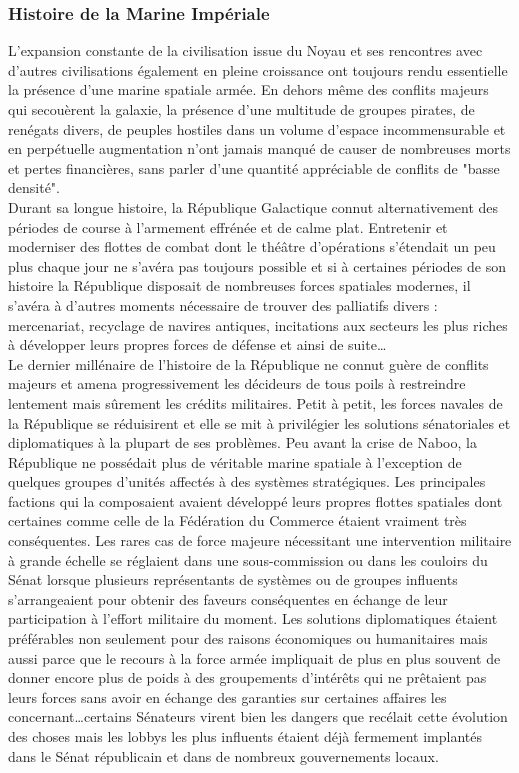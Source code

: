 \documentclass[twoside]{article}
\begin{document}
\subsubsection{Histoire de la Marine Impériale}
L'expansion constante de la civilisation issue du Noyau et ses rencontres avec d'autres civilisations également en pleine croissance ont toujours rendu essentielle la présence d'une marine spatiale armée. En dehors même des conflits majeurs qui secouèrent la galaxie, la présence d'une multitude de groupes pirates, de renégats divers, de peuples hostiles dans un volume d'espace incommensurable et en perpétuelle augmentation n'ont jamais manqué de causer de nombreuses morts et pertes financières, sans parler d'une quantité appréciable de conflits de "basse densité".\\

Durant sa longue histoire, la République Galactique connut alternativement des périodes de course à l'armement effrénée et de calme plat. Entretenir et moderniser des flottes de combat dont le théâtre d'opérations s'étendait un peu plus chaque jour ne s'avéra pas toujours possible et si à certaines périodes de son histoire la République disposait de nombreuses forces spatiales modernes, il s'avéra à d'autres moments nécessaire de trouver des palliatifs divers : mercenariat, recyclage de navires antiques, incitations aux secteurs les plus riches à développer leurs propres forces de défense et ainsi de suite\ldots\\

Le dernier millénaire de l'histoire de la République ne connut guère de conflits majeurs et amena progressivement les décideurs de tous poils à restreindre lentement mais sûrement les crédits militaires. Petit à petit, les forces navales de la République se réduisirent et elle se mit à privilégier les solutions sénatoriales et diplomatiques à la plupart de ses problèmes. Peu avant la crise de Naboo, la République ne possédait plus de véritable marine spatiale à l'exception de quelques groupes d'unités affectés à des systèmes stratégiques. Les principales factions qui la composaient avaient développé leurs propres flottes spatiales dont certaines comme celle de la Fédération du Commerce étaient vraiment très conséquentes. Les rares cas de force majeure nécessitant une intervention militaire à grande échelle se réglaient dans une sous-commission ou dans les couloirs du Sénat lorsque plusieurs représentants de systèmes ou de groupes influents s'arrangeaient pour obtenir des faveurs conséquentes en échange de leur participation à l'effort militaire du moment. Les solutions diplomatiques étaient préférables non seulement pour des raisons économiques ou humanitaires mais aussi parce que le recours à la force armée impliquait de plus en plus souvent de donner encore plus de poids à des groupements d'intérêts qui ne prêtaient pas leurs forces sans avoir en échange des garanties sur certaines affaires les concernant\ldots certains Sénateurs virent bien les dangers que recélait cette évolution des choses mais les lobbys les plus influents étaient déjà fermement implantés dans le Sénat républicain et dans de nombreux gouvernements locaux.\\
\end{document}
